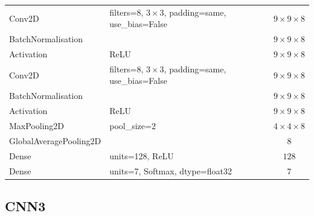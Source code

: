\documentclass[12pt, a4paper]{report}
\let\oldsubsection\subsection
\renewcommand{\subsection}{%
    \Needspace{6\baselineskip}%
    \oldsubsection
}
\begin{document}
\begin{table}[H]
\begin{tabular}{lp{6cm}c}
						Conv2D & filters=8, $3\times3$, padding=same, use\_bias=False & $9\times9\times8$ \\
						BatchNormalisation &  & $9\times9\times8$ \\
						Activation & ReLU & $9\times9\times8$ \\
						Conv2D & filters=8, $3\times3$, padding=same, use\_bias=False & $9\times9\times8$ \\
						BatchNormalisation &  & $9\times9\times8$ \\
						Activation & ReLU & $9\times9\times8$ \\
						MaxPooling2D & pool\_size=2 & $4\times4\times8$ \\
						GlobalAveragePooling2D &  & $8$ \\
						Dense & units=128, ReLU & $128$ \\
						Dense & units=7, Softmax, dtype=float32 & $7$ \\
						\bottomrule
					\end{tabular}
				\end{table}
			\newpage
			\subsection{CNN3}
				
\end{document}
